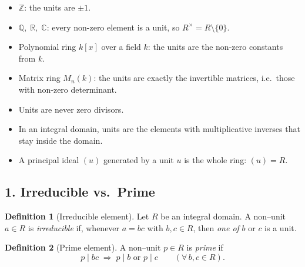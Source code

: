 \documentclass[12pt]{article}
\theoremstyle{definition} %
\newtheorem{definition}{Definition}
\theoremstyle{plain} %
\begin{document}
\begin{itemize}
  \item \(\mathbb Z\):  the units are \(\pm 1\).
  \item \(\mathbb Q,\;\mathbb R,\;\mathbb C\):  
        every non-zero element is a unit, so \(R^{\times}=R\setminus\{0\}\).
  \item Polynomial ring \(k[x]\) over a field \(k\):
        the units are the non-zero constants from \(k\).
  \item Matrix ring \(M_n(k)\):  
        the units are exactly the invertible matrices, i.e.\ those with
        non-zero determinant.
\end{itemize}

\begin{itemize}
  \item Units are never zero divisors.
  \item In an integral domain, units are the elements with multiplicative
        inverses that stay inside the domain.
  \item A principal ideal \((u)\) generated by a unit \(u\) is the whole
        ring: \((u)=R\).
\end{itemize}
\subsection*{1.  Irreducible vs.\ Prime}

\begin{definition}[Irreducible element]
  Let \(R\) be an integral domain.  
  A non–unit \(a\in R\) is \emph{irreducible} if, whenever
  \(
      a = bc
  \)
  with \(b,c\in R\), then \emph{one of} \(b\) or \(c\) is a unit.
\end{definition}

\begin{definition}[Prime element]
  A non–unit \(p\in R\) is \emph{prime} if
  \[
     p \mid bc \;\Longrightarrow\; p\mid b \text{ or } p\mid c
     \qquad
     (\forall\,b,c\in R).
  \]
\end{definition}
\end{document}
